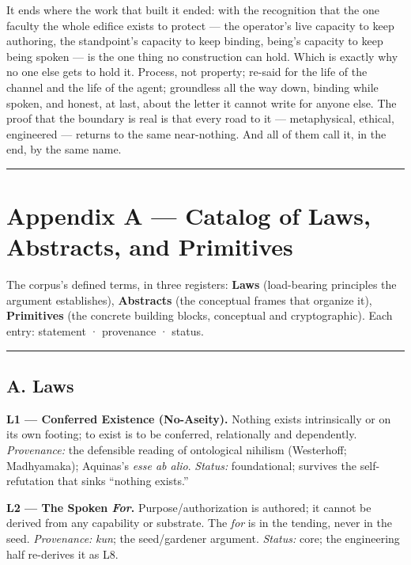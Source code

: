 \documentclass[11pt]{article}
\begin{document}
It ends where the work that built it ended: with the recognition that the one faculty the whole edifice exists to protect — the operator's live capacity to keep authoring, the standpoint's capacity to keep binding, being's capacity to keep being spoken — is the one thing no construction can hold. Which is exactly why no one else gets to hold it. Process, not property; re-said for the life of the channel and the life of the agent; groundless all the way down, binding while spoken, and honest, at last, about the letter it cannot write for anyone else. The proof that the boundary is real is that every road to it — metaphysical, ethical, engineered — returns to the same near-nothing. And all of them call it, in the end, by the same name.

\medskip\noindent\rule{\linewidth}{0.3pt}\medskip

\section*{Appendix A — Catalog of Laws, Abstracts, and Primitives}

The corpus's defined terms, in three registers: \textbf{Laws} (load-bearing principles the argument establishes), \textbf{Abstracts} (the conceptual frames that organize it), \textbf{Primitives} (the concrete building blocks, conceptual and cryptographic). Each entry: statement · provenance · status.

\medskip\noindent\rule{\linewidth}{0.3pt}\medskip

\subsection*{A. Laws}

\textbf{L1 — Conferred Existence (No-Aseity).} Nothing exists intrinsically or on its own footing; to exist is to be conferred, relationally and dependently. \emph{Provenance:} the defensible reading of ontological nihilism (Westerhoff; Madhyamaka); Aquinas's \emph{esse ab alio}. \emph{Status:} foundational; survives the self-refutation that sinks ``nothing exists.''

\textbf{L2 — The Spoken \emph{For}.} Purpose/\allowbreak{}authorization is authored; it cannot be derived from any capability or substrate. The \emph{for} is in the tending, never in the seed. \emph{Provenance:} \emph{kun}; the seed/\allowbreak{}gardener argument. \emph{Status:} core; the engineering half re-derives it as L8.
\end{document}
